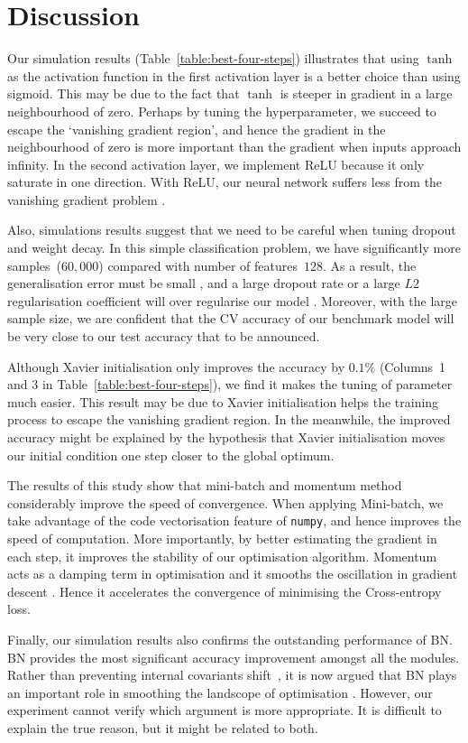 \section{Discussion}

Our simulation results (Table~\ref{table:best-four-steps}) illustrates that using $\tanh$ as the activation function in the first activation layer is a better choice than using sigmoid. This may be due to the fact that $\tanh$ is steeper in gradient in a large neighbourhood of zero. Perhaps by tuning the hyperparameter, we succeed to escape the `vanishing gradient region', and hence the gradient in the neighbourhood of zero is more important than the gradient when inputs approach infinity. In the second activation layer, we implement ReLU because it only saturate in one direction. With ReLU, our neural network suffers less from the vanishing gradient problem \citep{pmlr-v9-glorot10a}.

Also, simulations results suggest that we need to be careful when tuning dropout and weight decay. In this simple classification problem, we have significantly more samples~($60,000$) compared with number of  features~$128$. As a result, the generalisation error must be small \citep{james2013introduction}, and a large dropout rate or a large $L2$ regularisation coefficient will over regularise our model \citep{hastie01statisticallearning}. Moreover, with the large sample size, we are confident that the CV accuracy of our benchmark model will be very close to our test accuracy that to be announced.

Although Xavier initialisation only improves the accuracy by $0.1\%$ (Columns~1 and 3 in Table~\ref{table:best-four-steps}), we find it makes the tuning of parameter much easier. This result may be due to Xavier initialisation helps the training process to escape the vanishing gradient region. In the meanwhile, the improved accuracy might be explained by the hypothesis that Xavier initialisation moves our initial condition one step closer to the global optimum.

The results of this study show that mini-batch and momentum method considerably improve the speed of convergence. When applying Mini-batch, we take advantage of the code vectorisation feature of \texttt{numpy}, and hence improves the speed of computation. More importantly, by better estimating the gradient in each step, it improves the stability of our optimisation algorithm. Momentum acts as a damping term in optimisation and it smooths the oscillation in gradient descent \citep{goh2017why}. Hence it accelerates the convergence of minimising the Cross-entropy loss.

Finally, our simulation results also confirms the outstanding performance of BN. BN provides the most significant accuracy improvement amongst all the modules. Rather than preventing internal covariants shift~\citep{pmlr-v37-ioffe15}, it is now argued that BN plays an important role in smoothing the landscope of optimisation \citep{NIPS20187515}. However, our experiment cannot verify which argument is more appropriate. It is difficult to explain the true reason, but it might be related to both.